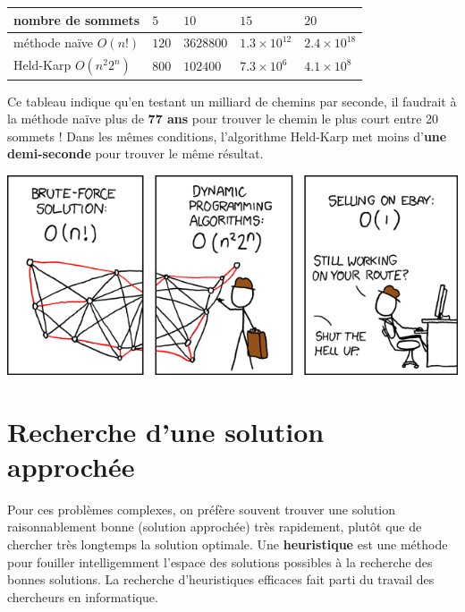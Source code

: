 \documentclass[a5paper,pagesize,DIV=14]{scrbook}
\begin{document}
\begin{center}
  \begin{tabular}{|l|llll|}
    \hline
    nombre de sommets       & $5$   & $10$      & $15$            & $20$ \\
    \hline
    méthode naïve $O(n!)$   & $120$ & $3628800$ & $1.3 \times 10^{12}$ & $2.4 \times 10^{18}$ \\
    Held-Karp $O(n^{2}2^n)$ & $800$ & $102400$  & $7.3 \times 10^6$       & $4.1 \times 10^8$ \\
    \hline
  \end{tabular} 
\end{center}

Ce tableau indique qu'en testant un milliard de chemins par seconde, il faudrait à la méthode naïve plus de \textbf{77 ans} pour trouver le chemin le plus court entre 20 sommets ! Dans les mêmes conditions, l'algorithme Held-Karp met moins d'\textbf{une demi-seconde} pour trouver le même résultat.

  \begin{center}
    \includegraphics[width=\linewidth]{img/tsp_xkcd.png}
    \label{img:tsp_xkcd}
  \end{center}

\section*{Recherche d'une solution approchée}

Pour ces problèmes complexes, on préfère souvent trouver une solution raisonnablement bonne (solution approchée) très rapidement, plutôt que de chercher très longtemps la solution optimale. Une \textbf{heuristique} est une méthode pour fouiller intelligemment l'espace des solutions possibles à la recherche des bonnes solutions. La recherche d'heuristiques efficaces fait parti du travail des chercheurs en informatique.
\end{document}

